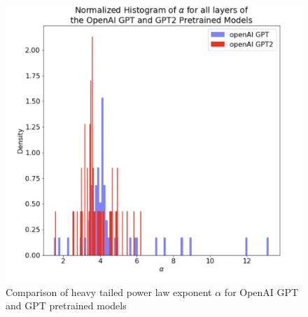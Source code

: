 \begin{figure}
   \includegraphics[scale=0.25]{img/gpt-alpha-hist.png}
   \caption{Comparison of heavy tailed power law exponent $\alpha$ for OpenAI GPT and GPT pretrained models}

   \label{fig:gpt-alphs-hist}
\end{figure}


